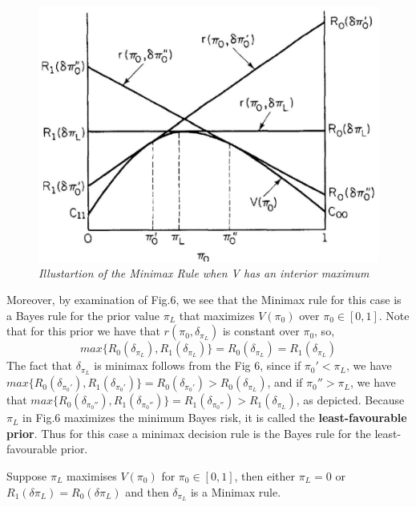 \documentclass[a4paper,english,12pt]{article}
\begin{document}
\begin{figure}[h]
	\centering
	\includegraphics[width=0.7\linewidth]{Figures/minimax2}
	\caption{\textit{Illustartion of the Minimax Rule when V has an interior maximum}}
	\label{fig:minimax2}
\end{figure}
Moreover, by examination of Fig.6, we see that the Minimax rule for this case is a Bayes rule for the prior value $\pi_L$ that maximizes $V(\pi_0)$
over $\pi_0 \in [0,1]$. Note that for this prior we have that $r(\pi_0,\delta_{\pi_L})$ is constant over $\pi_0$, so,
\begin{equation}
max\{ {R_0}({\delta _{{\pi _L}}}),{R_1}({\delta _{{\pi _L}}})\}  = {R_0}({\delta _{{\pi _L}}}) = {R_1}({\delta _{{\pi _L}}})
\end{equation}  
The fact that $\delta_{\pi_L}$ is minimax follows from the Fig 6, since if $\pi_0' < \pi_L$, we have $max\{ {R_0}({\delta _{\pi_0'}}),{R_1}({\delta _{\pi_0'}})\}  = {R_0}({\delta _{{\pi _0'}}})>{R_0}({\delta _{{\pi _L}}})$, and if $\pi_0'' > \pi_L$, we have that
$max\{ {R_0}({\delta _{\pi_0''}}),{R_1}({\delta _{\pi_0''}})\}  = {R_1}({\delta _{{\pi _0''}}})>{R_1}({\delta _{{\pi _L}}})$, as depicted.
Because $\pi_L$ in Fig.6 maximizes the minimum Bayes risk, it is called
the \textbf{least-favourable prior}. Thus for this case a minimax decision rule is the Bayes rule for the least-favourable prior.
\begin{prop}
Suppose $\pi_L$ maximises $V(\pi_0)$ for $\pi_0 \in [0,1]$, then either $\pi_L=0$ or $R_1(\delta{\pi_L})=R_0(\delta{\pi_L})$ and then $\delta_{\pi_L}$ is a Minimax rule.
\end{prop} 
\end{document}
